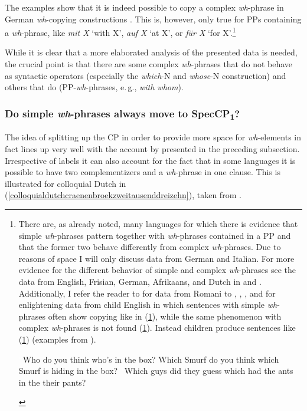 \noindent The examples show that it is indeed possible to copy a complex \textit{wh}-phrase in German \textit{wh}-copying constructions \citep{mcdaniel1986conditions, felser2004wh, nunes2004linearization, van2010complex}. This is, however, only true for PPs containing a \textit{wh}-phrase, like \textit{mit X} `with X', \textit{auf X} `at X', or \textit{für X} `for X'.\footnote{ There are, as already noted, many languages for which there is evidence that simple \textit{wh}-phrases pattern together with \textit{wh}-phrases contained in a PP and that the former two behave differently from complex \textit{wh}-phrases. Due to reasons of space I will only discuss data from German and Italian. For more evidence for the different behavior of simple and complex \textit{wh}-phrases see the data from English, Frisian, German, Afrikaans, and Dutch in \citet{van2010complex, van2012you} and \citet{felser2004wh}. Additionally, I refer the reader to \citet{mcdaniel1986conditions, mcdaniel1989partial} for data from Romani to \citet{de1990acquisition}, \citet{thornton1990adventures}, \citet{thornton1999levels}, and \citet{mcdaniel1995parameters} for enlightening data from child English in which sentences with simple \textit{wh}-phrases often show copying like in (\ref{childrensenglisha}), while the same phenomenon with complex \textit{wh}-phrases is not found (\ref{childrensenglishb}). Instead children produce sentences like (\ref{childrensenglishc}) (examples from \citealt[7]{thornton1999levels}).

\begin{exe}
\ex\label{childrensenglish}\begin{xlist}
\ex \textcolor{white}{*}Who do you think who's in the box? \label{childrensenglisha}
\ex *Which Smurf do you think which Smurf is hiding in the box? \label{childrensenglishb}
\ex \textcolor{white}{*}Which guys did they guess which had the ants in the their pants? \label{childrensenglishc}
\end{xlist}
\end{exe}



}  

While it is clear that a more elaborated analysis of the presented data is needed, the crucial point is that there are some complex \textit{wh}-phrases that do not behave as syntactic operators (especially the \textit{which}-N and \textit{whose}-N construction) and others that do (PP-\textit{wh}-phrases, e.\,g., \textit{with whom}). 

\subsubsection{Do simple \textit{wh}-phrases always move to SpecCP\textsubscript{1}?}
The idea of splitting up the CP in order to provide more space for \textit{wh}-elements in fact lines up very well with the account by \citet{aboh2010sa} presented in the preceding subsection. Irrespective of labels it can also account for the fact that in some languages it is possible to have two complementizers and a \textit{wh}-phrase in one clause. This is illustrated for colloquial Dutch in (\ref{colloquialdutchcraenenbroekzweitausenddreizehn}), taken from \citet[45]{van2012you}.

